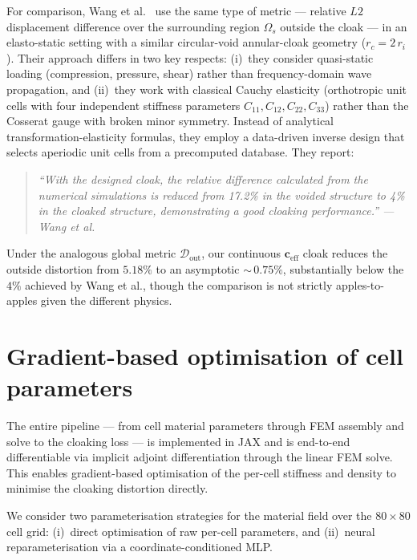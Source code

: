 \documentclass{article}
\newcommand{\mbf}[1]{\mathbf{#1}}
\begin{document}
\noindent
For comparison, Wang et al.~\cite{wang2022} use the same type of
metric --- relative $L2$ displacement difference over the surrounding
region $\Omega_s$ outside the cloak --- in an elasto-static setting
with a similar circular-void annular-cloak geometry ($r_c = 2\,r_i$).
Their approach differs in two key respects:
(i)~they consider quasi-static loading (compression, pressure, shear)
rather than frequency-domain wave propagation, and
(ii)~they work with classical Cauchy elasticity (orthotropic unit cells
with four independent stiffness parameters $C_{11}, C_{12}, C_{22},
C_{33}$) rather than the Cosserat gauge with broken minor symmetry.
Instead of analytical transformation-elasticity formulas, they employ a
data-driven inverse design that selects aperiodic unit cells from a
precomputed database.
They report:
\begin{quote}
\itshape
``With the designed cloak, the relative difference calculated from
the numerical simulations is reduced from 17.2\% in the voided
structure to 4\% in the cloaked structure, demonstrating a good
cloaking performance.''
\upshape\hfill --- Wang et al.~\cite{wang2022}
\end{quote}
\noindent
Under the analogous global metric $\mathcal{D}_{\mathrm{out}}$,
our continuous $\mbf{c}_{\mathrm{eff}}$ cloak reduces the outside
distortion from $5.18\%$ to an asymptotic ${\sim}\,0.75\%$, substantially below
the $4\%$ achieved by Wang et al., though the comparison is not
strictly apples-to-apples given the different physics.

\section{Gradient-based optimisation of cell parameters}
\label{sec:optimisation}

The entire pipeline --- from cell material parameters through FEM
assembly and solve to the cloaking loss --- is implemented in JAX
and is end-to-end differentiable via implicit adjoint differentiation
through the linear FEM solve.
This enables gradient-based optimisation of the per-cell stiffness
and density to minimise the cloaking distortion directly.

We consider two parameterisation strategies for the material field
over the $80\times80$ cell grid: (i)~direct optimisation of raw
per-cell parameters, and (ii)~neural reparameterisation via a
coordinate-conditioned MLP.
\end{document}
